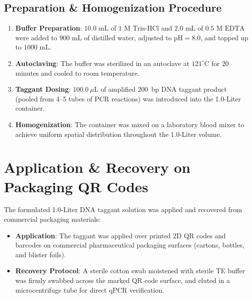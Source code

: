 \subsection{Preparation \& Homogenization Procedure}
\begin{enumerate}
    \item \textbf{Buffer Preparation}: $10.0\text{ mL}$ of $1\text{ M Tris-HCl}$ and $2.0\text{ mL}$ of $0.5\text{ M EDTA}$ were added to $900\text{ mL}$ of distilled water, adjusted to $\text{pH} = 8.0$, and topped up to $1000\text{ mL}$.
    \item \textbf{Autoclaving}: The buffer was sterilized in an autoclave at $121^\circ\text{C}$ for 20 minutes and cooled to room temperature.
    \item \textbf{Taggant Dosing}: $100.0~\mu\text{L}$ of amplified 200~bp DNA taggant product (pooled from 4--5 tubes of PCR reactions) was introduced into the 1.0-Liter container.
    \item \textbf{Homogenization}: The container was mixed on a laboratory blood mixer to achieve uniform spatial distribution throughout the 1.0-Liter volume.
\end{enumerate}

\section{Application \& Recovery on Packaging QR Codes}
The formulated 1.0-Liter DNA taggant solution was applied and recovered from commercial packaging materials:
\begin{itemize}
    \item \textbf{Application}: The taggant was applied over printed 2D QR codes and barcodes on commercial pharmaceutical packaging surfaces (cartons, bottles, and blister foils).
    \item \textbf{Recovery Protocol}: A sterile cotton swab moistened with sterile TE buffer was firmly swabbed across the marked QR code surface, and eluted in a microcentrifuge tube for direct qPCR verification.
\end{itemize}
